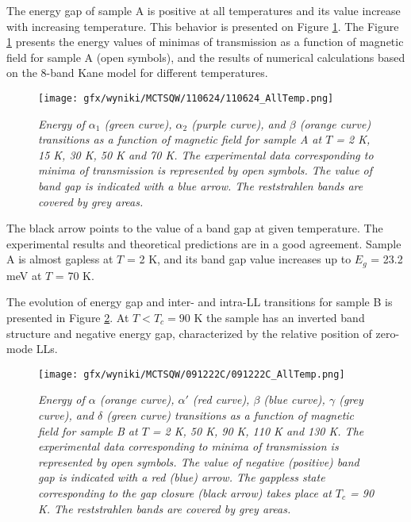 \documentclass[titlepage,a4paper]{book}
\begin{document}
The energy gap of sample A is positive at all temperatures and its value increase with increasing temperature. This behavior is presented on Figure \ref{fig:110624_AllTemp}. The Figure \ref{fig:110624_AllTemp} presents the energy values of minimas of transmission as a function of magnetic field for sample A (open symbols), and the results of numerical calculations based on the 8-band Kane model for different temperatures.   
\begin{figure}[ht]
	\centering
	\texttt{[image: gfx/wyniki/MCTSQW/110624/110624\_AllTemp.png]}
	\vspace{-10pt}
	\caption{\textit{Energy of $\alpha_1$ (green curve), $\alpha_2$ (purple curve), and $\beta$ (orange curve) transitions as a function of magnetic field for sample A at $T$ = 2 K, 15 K, 30 K, 50 K and 70 K. The experimental data corresponding to minima of transmission is represented by open symbols. The value of band gap is indicated with a blue arrow. The reststrahlen bands are covered by grey areas.}}
	\label{fig:110624_AllTemp}
\end{figure}
The black arrow points to the value of a band gap at given temperature. The experimental results and theoretical predictions are in a good agreement. Sample A is almost gapless at $T$ = 2 K, and its band gap value increases up to $E_g$ = 23.2 meV at $T$ = 70 K.

The evolution of energy gap and inter- and intra-LL transitions for sample B is presented in Figure \ref{fig:091222C_AllTemp}. At $T < T_c = 90$ K the sample has an inverted band structure and negative energy gap, characterized by the relative position of zero-mode LLs. 

\begin{figure}[ht]
	\centering
	\texttt{[image: gfx/wyniki/MCTSQW/091222C/091222C\_AllTemp.png]}
	\vspace{-10pt}
	\caption{\textit{Energy of $\alpha$ (orange curve), $\alpha'$ (red curve), $\beta$ (blue curve), $\gamma$ (grey curve), and $\delta$ (green curve) transitions as a function of magnetic field for sample B at $T$ = 2 K, 50 K, 90 K, 110 K and 130 K. The experimental data corresponding to minima of transmission is represented by open symbols. The value of negative (positive) band gap is indicated with a red (blue) arrow. The gappless state corresponding to the gap closure (black arrow) takes place at $T_c$ = 90 K. The reststrahlen bands are covered by grey areas.}}
	\label{fig:091222C_AllTemp}
\end{figure}
\end{document}
